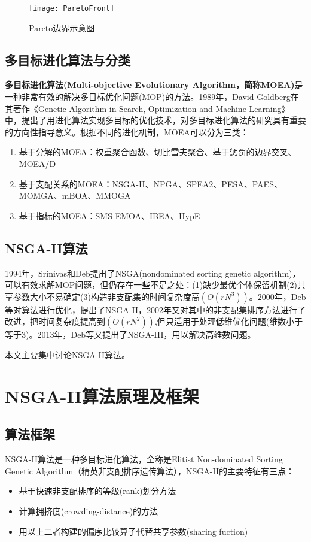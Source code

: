 \documentclass[lang=cn,a4paper,citestyle=gb7714-2015, bibstyle=gb7714-2015]{elegantpaper}
\begin{document}
    \begin{figure}[!h]
        \centering
        \texttt{[image: ParetoFront]}
        \caption{Pareto边界示意图}
        \label{fig:pf}
    \end{figure}

    \subsection{多目标进化算法与分类}
    \textbf{多目标进化算法(Multi-objective Evolutionary Algorithm，简称MOEA)}是一种非常有效的解决多目标优化问题(MOP)的方法。1989年，David Goldberg在其著作《Genetic Algorithm in Search, Optimization and Machine Learning\parencite{goldberg1989genetic}》中，提出了用进化算法实现多目标的优化技术，对多目标进化算法的研究具有重要的方向性指导意义。根据不同的进化机制，MOEA可以分为三类\parencite{郑金华2017多目标进化优化}：
    \begin{enumerate}
        \item 基于分解的MOEA：权重聚合函数、切比雪夫聚合、基于惩罚的边界交叉、MOEA/D
        \item 基于支配关系的MOEA：NSGA-II、NPGA、SPEA2、PESA、PAES、MOMGA、mBOA、MMOGA
        \item 基于指标的MOEA：SMS-EMOA、IBEA、HypE
    \end{enumerate}

    \subsection{NSGA-II算法}
    1994年，Srinivas和Deb提出了NSGA(nondominated sorting genetic algorithm)\parencite{NSGA}，可以有效求解MOP问题，但仍存在一些不足之处：(1)缺少最优个体保留机制(2)共享参数大小不易确定(3)构造非支配集的时间复杂度高$(O(rN^3))$。2000年，Deb等对算法进行优化，提出了NSGA-II\parencite{NSGA2prototype}，2002年又对其中的非支配集排序方法进行了改进\parencite{NSGA2}，把时间复杂度提高到$(O(rN^2))$,但只适用于处理低维优化问题(维数小于等于3)。2013年，Deb等又提出了NSGA-III\parencite{NSGA3}，用以解决高维数问题。

    本文主要集中讨论NSGA-II算法。

    \section{NSGA-II算法原理及框架}
    \subsection{算法框架}
    NSGA-II算法是一种多目标进化算法，全称是Elitist Non-dominated Sorting Genetic Algorithm（精英非支配排序遗传算法），NSGA-II的主要特征有三点：
    \begin{itemize}
        \item 基于快速非支配排序的等级(rank)划分方法
        \item 计算拥挤度(crowding-distance)的方法
        \item 用以上二者构建的偏序比较算子代替共享参数(sharing fuction)
    \end{itemize}
\end{document}
